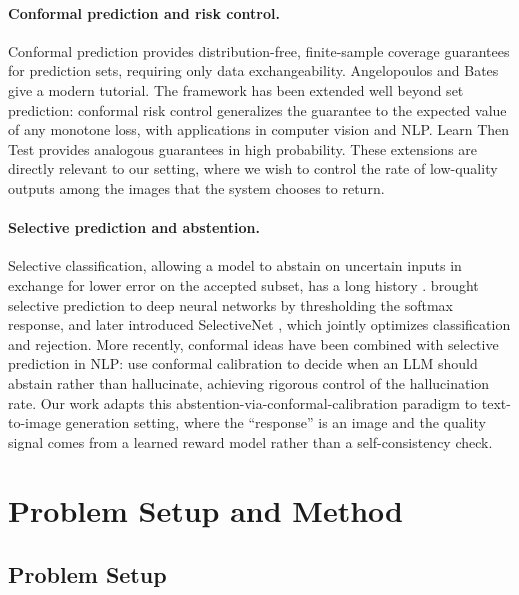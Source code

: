 \documentclass[twocolumn,11pt]{article}
\theoremstyle{plain}
\theoremstyle{definition}
\theoremstyle{remark}
\begin{document}
\paragraph{Conformal prediction and risk control.}
Conformal prediction \citep{vovk2005algorithmic, shafer2008tutorial} provides distribution-free, finite-sample coverage guarantees for prediction sets, requiring only data exchangeability. Angelopoulos and Bates \citep{angelopoulos2023conformal} give a modern tutorial. The framework has been extended well beyond set prediction: conformal risk control \citep{angelopoulos2022conformal} generalizes the guarantee to the expected value of any monotone loss, with applications in computer vision and NLP. Learn Then Test \citep{angelopoulos2025learn} provides analogous guarantees in high probability. These extensions are directly relevant to our setting, where we wish to control the rate of low-quality outputs among the images that the system chooses to return.

\paragraph{Selective prediction and abstention.}
Selective classification, allowing a model to abstain on uncertain inputs in exchange for lower error on the accepted subset, has a long history \citep{chow1957optimum, el2010foundations}. \citet{geifman2017selective} brought selective prediction to deep neural networks by thresholding the softmax response, and later introduced SelectiveNet \citep{geifman2019selectivenet}, which jointly optimizes classification and rejection. More recently, conformal ideas have been combined with selective prediction in NLP: \citet{yadkori2024mitigating} use conformal calibration to decide when an LLM should abstain rather than hallucinate, achieving rigorous control of the hallucination rate. Our work adapts this abstention-via-conformal-calibration paradigm to text-to-image generation setting, where the ``response'' is an image and the quality signal comes from a learned reward model rather than a self-consistency check.

\section{Problem Setup and Method}
\subsection{Problem Setup}
\end{document}
